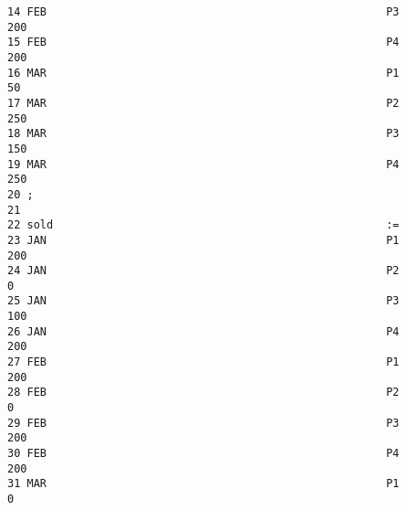 \documentclass[12pt]{article}
\begin{document}
\begin{verbatim}
14 FEB                                                    P3                                 200                                                     
15 FEB                                                    P4                                 200                                                     
16 MAR                                                    P1                                 50                                                     
17 MAR                                                    P2                                 250                                                     
18 MAR                                                    P3                                 150                                                     
19 MAR                                                    P4                                 250                                                     
20 ;                                                                                                                           
21                                                                                                                             
22 sold                                                   :=                                                    
23 JAN                                                    P1                                 200                                                     
24 JAN                                                    P2                                 0                                                     
25 JAN                                                    P3                                 100                                                     
26 JAN                                                    P4                                 200                                                     
27 FEB                                                    P1                                 200                                                     
28 FEB                                                    P2                                 0                                                     
29 FEB                                                    P3                                 200                                                     
30 FEB                                                    P4                                 200                                                     
31 MAR                                                    P1                                 0                                                     

\end{verbatim}
\end{document}
